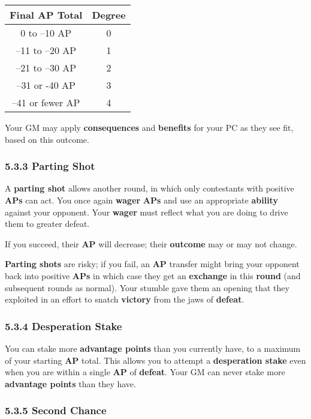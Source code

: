 \documentclass[
  11pt,
]{article}
\begin{document}
\begin{longtable}[]{@{}cc@{}}
\toprule
Final AP Total & Degree \\
\midrule
\endhead
0 to --10 AP & 0 \\
--11 to --20 AP & 1 \\
--21 to --30 AP & 2 \\
--31 or -40 AP & 3 \\
--41 or fewer AP & 4 \\
\bottomrule
\end{longtable}

Your GM may apply \textbf{consequences} and \textbf{benefits} for your
PC as they see fit, based on this outcome.

\hypertarget{parting-shot-2}{%
\subsubsection{5.3.3 Parting Shot}\label{parting-shot-2}}

A \textbf{parting shot} allows another round, in which only contestants
with positive \textbf{APs} can act. You once again \textbf{wager}
\textbf{APs} and use an appropriate \textbf{ability} against your
opponent. Your \textbf{wager} must reflect what you are doing to drive
them to greater defeat.

If you succeed, their \textbf{AP} will decrease; their \textbf{outcome}
may or may not change.

\textbf{Parting shots} are risky; if you fail, an \textbf{AP} transfer
might bring your opponent back into positive \textbf{APs} in which case
they get an \textbf{exchange} in this \textbf{round} (and subsequent
rounds as normal). Your stumble gave them an opening that they exploited
in an effort to snatch \textbf{victory} from the jaws of
\textbf{defeat}.

\hypertarget{desperation-stake}{%
\subsubsection{5.3.4 Desperation Stake}\label{desperation-stake}}

You can stake more \textbf{advantage points} than you currently have, to
a maximum of your starting \textbf{AP} total. This allows you to attempt
a \textbf{desperation stake} even when you are within a single
\textbf{AP} of \textbf{defeat}. Your GM can never stake more
\textbf{advantage points} than they have.

\hypertarget{second-chance}{%
\subsubsection{5.3.5 Second Chance}\label{second-chance}}
\end{document}
